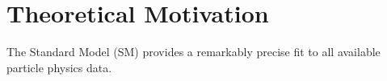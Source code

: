 \chapter{Theoretical Motivation}

The Standard Model (SM) provides a remarkably precise fit to all available particle physics data.





